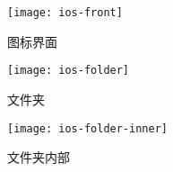 \begin{figure}[h]
	\begin{minipage}[t]{0.3\linewidth}
		\centering
		\texttt{[image: ios-front]}
		\label{fig:ios-front} 
		\caption{图标界面}
	\end{minipage}
	\hfill
	\begin{minipage}[t]{0.3\linewidth}
		\centering
		\texttt{[image: ios-folder]}
		\label{fig:ios-folder} 
		\caption{文件夹}
	\end{minipage}
	\hfill
	\begin{minipage}[t]{0.3\linewidth}
		\centering
		\texttt{[image: ios-folder-inner]}
		\label{fig:ios-folder-inner} 
		\caption{文件夹内部}
	\end{minipage}
\end{figure}
